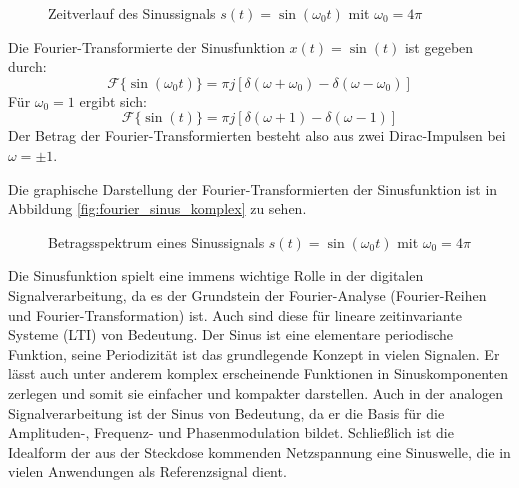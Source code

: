 \begin{figure}[H]
\centering
{}
\caption{Zeitverlauf des Sinussignals $s(t) = \sin(\omega_0 t)$ mit $\omega_0 = 4\pi$}
\end{figure}



Die Fourier-Transformierte der Sinusfunktion $x(t) = \sin(t)$ ist gegeben durch:
\[
\mathcal{F}\{\sin(\omega_0 t)\} = \pi j \left[ \delta(\omega + \omega_0) - \delta(\omega - \omega_0) \right]
\]
Für $\omega_0 = 1$ ergibt sich:
\[
\mathcal{F}\{\sin(t)\} = \pi j \left[ \delta(\omega + 1) - \delta(\omega - 1) \right]
\]
Der Betrag der Fourier-Transformierten besteht also aus zwei Dirac-Impulsen bei $\omega = \pm 1$.

Die graphische Darstellung der Fourier-Transformierten der Sinusfunktion ist in Abbildung \ref{fig:fourier_sinus_komplex} zu sehen.
\begin{figure}[H]
\centering
{}
\caption{Betragsspektrum eines Sinussignals $s(t) = \sin(\omega_0 t)$ mit $\omega_0 = 4\pi$}
\end{figure}

Die Sinusfunktion spielt eine immens wichtige Rolle in der digitalen Signalverarbeitung, da es der Grundstein der Fourier-Analyse (Fourier-Reihen und Fourier-Transformation) ist. Auch sind diese für lineare zeitinvariante Systeme (LTI) von Bedeutung. 
Der Sinus ist eine elementare periodische Funktion, seine Periodizität ist das grundlegende Konzept in vielen Signalen. Er lässt auch unter anderem komplex erscheinende Funktionen in Sinuskomponenten zerlegen und somit sie einfacher und kompakter darstellen.
Auch in der analogen Signalverarbeitung ist der Sinus von Bedeutung, da er die Basis für die Amplituden-, Frequenz- und Phasenmodulation bildet. Schließlich ist die Idealform der aus der Steckdose kommenden Netzspannung eine Sinuswelle, die in vielen Anwendungen als Referenzsignal dient. 

